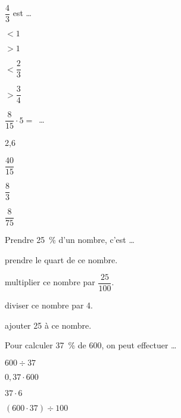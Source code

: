 \begin{QCM}
  \begin{GroupeQCM}
    \begin{exercice}
      $\dfrac{4}{3}$ est \ldots
      \begin{ChoixQCM}{4}
      \item $< 1$
      \item $> 1$
      \item $< \dfrac{2}{3}$
      \item $> \dfrac{3}{4}$
      \end{ChoixQCM}
\begin{corrige}
   \end{corrige}
    \end{exercice}
    
    
    \begin{exercice}
      $\dfrac{8}{15} \cdot 5 =$ \ldots
      \begin{ChoixQCM}{4}
      \item 2,6
      \item $\dfrac{40}{15}$
      \item $\dfrac{8}{3}$
      \item $\dfrac{8}{75}$
      \end{ChoixQCM}
\begin{corrige}
   \end{corrige}
    \end{exercice}
    
    
    \begin{exercice}
      Prendre 25 \% d'un nombre, c'est \ldots
      \begin{ChoixQCM}{4}
      \item prendre le quart de ce nombre.
      \item multiplier ce nombre par $\dfrac{25}{100}$.
      \item diviser ce nombre par 4.
      \item ajouter 25 à \newline ce nombre.
      \end{ChoixQCM}
\begin{corrige}
   \end{corrige}
    \end{exercice}
    
    
    \begin{exercice}
      Pour calculer 37 \% de 600, on peut effectuer \ldots
      \begin{ChoixQCM}{4}
      \item $600 \div 37$
      \item $0,37 \cdot 600$
      \item $37 \cdot 6$
      \item $(600 \cdot 37) \div 100$
      \end{ChoixQCM}
\begin{corrige}
   \end{corrige}
    \end{exercice}
 


\end{GroupeQCM}
\end{QCM}

